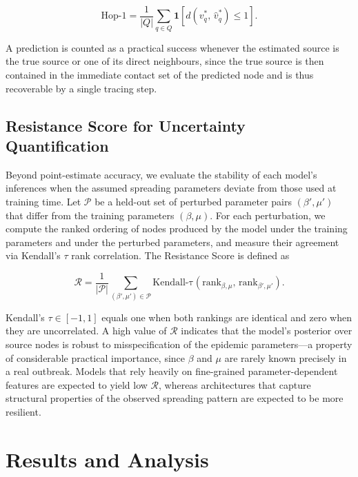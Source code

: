 \[
    \mathrm{Hop\text{-}1} = \frac{1}{|Q|} \sum_{q \in Q} \mathbf{1}\!\left[d\!\left(v_q^*,\, \hat{v}_q^*\right) \leq 1\right].
\]

A prediction is counted as a practical success whenever the estimated source is the true source or one of its direct neighbours, since the true source is then contained in the immediate contact set of the predicted node and is thus recoverable by a single tracing step.

\subsection{Resistance Score for Uncertainty Quantification}
\label{ssst:resistancescore}

Beyond point-estimate accuracy, we evaluate the stability of each model's inferences when the assumed spreading parameters deviate from those used at training time. Let $\mathcal{P}$ be a held-out set of perturbed parameter pairs $(\beta', \mu')$ that differ from the training parameters $(\beta, \mu)$. For each perturbation, we compute the ranked ordering of nodes produced by the model under the training parameters and under the perturbed parameters, and measure their agreement via Kendall's $\tau$ rank correlation. The Resistance Score is defined as

\[
    \mathcal{R} = \frac{1}{|\mathcal{P}|} \sum_{(\beta', \mu') \in \mathcal{P}} \mathrm{Kendall\text{-}\tau}\!\left(\mathrm{rank}_{\beta,\mu},\, \mathrm{rank}_{\beta',\mu'}\right).
\]

Kendall's $\tau \in [-1, 1]$ equals one when both rankings are identical and zero when they are uncorrelated. A high value of $\mathcal{R}$ indicates that the model's posterior over source nodes is robust to misspecification of the epidemic parameters---a property of considerable practical importance, since $\beta$ and $\mu$ are rarely known precisely in a real outbreak. Models that rely heavily on fine-grained parameter-dependent features are expected to yield low $\mathcal{R}$, whereas architectures that capture structural properties of the observed spreading pattern are expected to be more resilient.

\section{Results and Analysis}
\label{st:results}


